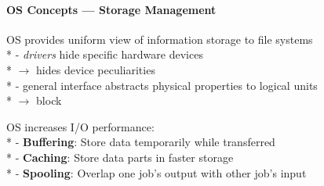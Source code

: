 \paragraph{OS Concepts --- Storage Management}
\begin{items}
	\item OS provides uniform view of information storage to file systems \\*
		- \emph{drivers} hide specific hardware devices \\* \phantom{-} \( \to \) hides device peculiarities \\*
		- general interface abstracts physical properties to logical units \\* \phantom{-} \( \to \) block
	\item OS increases I/O performance: \\*
		- \textbf{Buffering}: Store data temporarily while transferred \\*
		- \textbf{Caching}: Store data parts in faster storage \\*
		- \textbf{Spooling}: Overlap one job's output with other job's input
\end{items}
